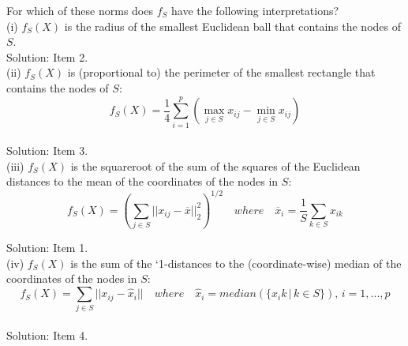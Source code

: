 \documentclass{article}
\begin{document}
For which of these norms does $f_S$ have the following interpretations? \\

(i) $f_S(X)$ is the radius of the smallest Euclidean ball that contains the nodes of $S$.\\

Solution: Item 2.\\


(ii) $f_S(X)$ is (proportional to) the perimeter of the smallest rectangle that contains the nodes of $S$:
$$ f_S(X) = \frac{1}{4} \sum_{i = 1}^{p} 
(\max_{j \in S} x_{ij} - \min_{j \in S} x_{ij})$$ \\

Solution: Item 3.\\

(iii) $f_S(X)$ is the squareroot of the sum of the squares of the Euclidean distances to the mean
of the coordinates of the nodes in $S$: \\

$$f_S(X) = (\sum_{j \in S} 
||x_{ij} - \overline x||^2_2)^{1/2}  \quad where \quad
\overline x_i = \frac{1}{S} \sum_{k \in S} x_{ik} $$  

Solution: Item 1.\\

(iv) $f_S(X)$  is the sum of the `1-distances to the (coordinate-wise) median of the coordinates
of the nodes in $S$:
$$f_S(X) = 
\sum_{j \in S} ||x_{ij} - \hat x_i|| \quad where \quad
\hat x_i = median(\{x_ik \, | \, k \in S\}), \, 
i = 1, ... , p$$ \\

Solution: Item 4.\\
\end{document}
